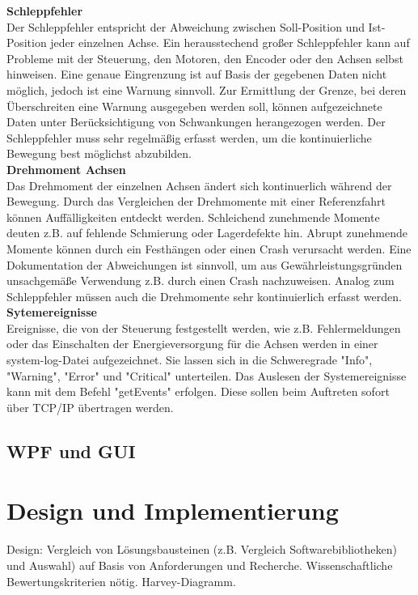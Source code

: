 \documentclass[ a4paper,
                oneside,
                toc=bibliography,
                toc=listof
                ]{scrbook}
\begin{document}
 	\textbf{Schleppfehler}\\
 	Der Schleppfehler entspricht der Abweichung zwischen Soll-Position und Ist-Position jeder einzelnen Achse. Ein herausstechend großer Schleppfehler kann auf Probleme mit der Steuerung, den Motoren, den Encoder oder den Achsen selbst hinweisen. Eine genaue Eingrenzung ist auf Basis der gegebenen Daten nicht möglich, jedoch ist eine Warnung sinnvoll. Zur Ermittlung der Grenze, bei deren Überschreiten eine Warnung ausgegeben werden soll, können aufgezeichnete Daten unter Berücksichtigung von Schwankungen herangezogen werden. Der Schleppfehler muss sehr regelmäßig erfasst werden, um die kontinuierliche Bewegung best möglichst abzubilden.\\
 	\textbf{Drehmoment Achsen}\\
 	Das Drehmoment der einzelnen Achsen ändert sich kontinuerlich während der Bewegung. Durch das Vergleichen der Drehmomente mit einer Referenzfahrt können  Auffälligkeiten entdeckt werden. Schleichend zunehmende Momente deuten z.B. auf fehlende Schmierung oder Lagerdefekte hin. Abrupt zunehmende Momente können durch ein Festhängen oder einen Crash verursacht werden. Eine Dokumentation der Abweichungen ist sinnvoll, um aus Gewährleistungsgründen unsachgemäße Verwendung z.B. durch einen Crash nachzuweisen. Analog zum Schleppfehler müssen auch die Drehmomente sehr kontinuierlich erfasst werden.\\
	\textbf{Sytemereignisse}\\
	Ereignisse, die von der Steuerung festgestellt werden, wie z.B. Fehlermeldungen oder das Einschalten der Energieversorgung für die Achsen werden in einer system-log-Datei aufgezeichnet. Sie lassen sich in die Schweregrade "Info", "Warning", "Error" und "Critical" unterteilen. Das Auslesen der Systemereignisse kann mit dem Befehl "getEvents" erfolgen. Diese sollen beim Auftreten sofort über TCP/IP übertragen werden.
	\newpage
	
	\section{WPF und GUI}
	
	\chapter{Design und Implementierung}
	Design: Vergleich von Lösungsbausteinen (z.B. Vergleich Softwarebibliotheken) und Auswahl) auf Basis von Anforderungen und Recherche. Wissenschaftliche Bewertungskriterien nötig. Harvey-Diagramm.
	
\end{document}

